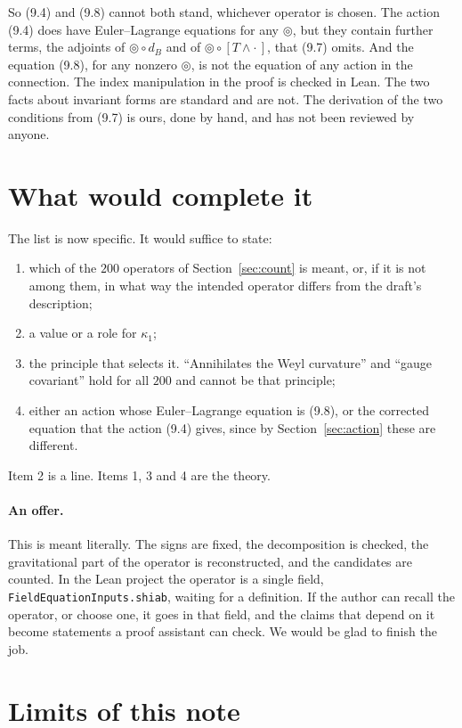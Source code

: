 \documentclass[11pt]{article}
\theoremstyle{remark}
\newcommand{\Sh}{\circledcirc}
\newcommand{\lean}[1]{\texttt{#1}}
\begin{document}
So (9.4) and (9.8) cannot both stand, whichever operator is chosen. The action (9.4) does have
Euler--Lagrange equations for any $\Sh$, but they contain further terms, the adjoints of
$\Sh\circ d_B$ and of $\Sh\circ[T\wedge\cdot\,]$, that (9.7) omits. And the equation (9.8), for
any nonzero $\Sh$, is not the equation of any action in the connection. The index manipulation
in the proof is checked in Lean. The two facts about invariant forms are standard and are not.
The derivation of the two conditions from (9.7) is ours, done by hand, and has not been
reviewed by anyone.

\section{What would complete it}

The list is now specific. It would suffice to state:
\begin{enumerate}
\item which of the $200$ operators of Section~\ref{sec:count} is meant, or, if it is not among
them, in what way the intended operator differs from the draft's description;
\item a value or a role for $\kappa_1$;
\item the principle that selects it. ``Annihilates the Weyl curvature'' and ``gauge covariant''
hold for all $200$ and cannot be that principle;
\item either an action whose Euler--Lagrange equation is (9.8), or the corrected equation that
the action (9.4) gives, since by Section~\ref{sec:action} these are different.
\end{enumerate}
Item 2 is a line. Items 1, 3 and 4 are the theory.

\paragraph{An offer.} This is meant literally. The signs are fixed, the decomposition is
checked, the gravitational part of the operator is reconstructed, and the candidates are
counted. In the Lean project the
operator is a single field, \lean{FieldEquationInputs.shiab}, waiting for a definition. If the
author can recall the operator, or choose one, it goes in that field, and the claims that
depend on it become statements a proof assistant can check. We would be glad to finish the
job.

\section{Limits of this note}\label{sec:limits}
\end{document}
